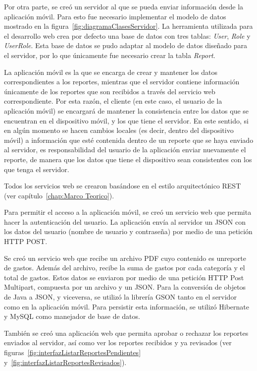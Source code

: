 Por otra parte, se creó un servidor al que se pueda enviar información desde la aplicación móvil. 
Para esto fue necesario implementar el modelo de datos mostrado en la figura~\ref{fig:diagramaClasesServidor}. La herramienta utilizada para el desarrollo web crea por defecto una base de datos con tres tablas: \textit{User}, \textit{Role} y \textit{UserRole}. Esta base de datos se pudo adaptar al modelo de datos diseñado para el servidor, por lo que únicamente fue necesario crear la tabla \textit{Report}.

La aplicación móvil es la que se encarga de crear y mantener los datos correspondientes a los reportes, mientras que el servidor contiene información únicamente de los reportes que son recibidos a través del servicio web correspondiente. Por esta razón, el cliente (en este caso, el usuario de la aplicación móvil) se encargará de mantener la consistencia entre los datos que se encuentran en el dispositivo móvil, y los que tiene el servidor. En este sentido, si en algún momento se hacen cambios locales (es decir, dentro del dispositivo móvil) a información que esté contenida dentro de un reporte que se haya enviado al servidor, es responsabilidad del usuario de la aplicación enviar nuevamente el reporte, de manera que los datos que tiene el dispositivo sean consistentes con los que tenga el servidor.

Todos los servicios web se crearon basándose en el estilo arquitectónico REST (ver capítulo~\ref{chap:Marco Teorico}). 

Para permitir el acceso a la aplicación móvil, se creó un servicio web que permita hacer la autenticación del usuario. La aplicación envía al servidor un JSON con los datos del usuario (nombre de usuario y contraseña) por medio de una petición HTTP POST.

Se creó un servicio web que recibe un archivo PDF cuyo contenido es unreporte de gastos. Además del archivo, recibe la suma de gastos por cada categoría y el total de gastos. Estos datos se enviaron por medio de una petición HTTP Post Multipart, compuesta por un archivo y un JSON. Para la conversión de objetos de Java a JSON, y viceversa, se utilizó la librería GSON tanto en el servidor como en la aplicación móvil. Para persistir esta información, se utilizó Hibernate y MySQL como manejador de base de datos.

También se creó una aplicación web que permita aprobar o rechazar los reportes enviados al servidor, así como ver los reportes recibidos y ya revisados (ver figuras~\ref{fig:interfazListarReportesPendientes} y~\ref{fig:interfazListarReportesRevisados}). 

